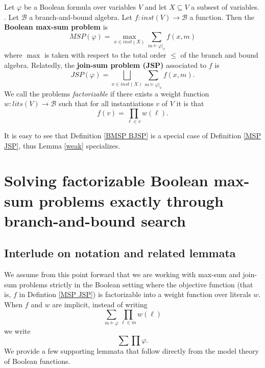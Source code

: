 \documentclass[acmsmall,review]{acmart}\settopmatter{printfolios=true,printccs=false,printacmref=false}
\begin{document}
\begin{definition}\label{BMSP BJSP}
  Let $\varphi$ be a Boolean formula over variables $V$ and let $X \subseteq V$ a subsest of variables. . Let $\mathcal B$ a branch-and-bound algebra. Let $f: inst(V) \to \mathcal B$ a function. Then the \textbf{Boolean max-sum problem} is
  \begin{equation}\label{BMSP}
    MSP(\varphi) = \max_{x \in inst(X)} \sum_{m \models \varphi|_x} f(x,m)
  \end{equation}
  where $\max$ is taken with respect to the total order $\leq$ of the branch and bound algebra. Relatedly, the \textbf{join-sum problem (JSP)} associated to $f$ is 
  \begin{equation}\label{BJSP}
    JSP(\varphi) = \bigsqcup_{x \in inst(X)} \sum_{m \models \varphi|_x} f(x,m).
  \end{equation}
  We call the problems \emph{factorizable} if there exists a weight function $w : lits(V) \to \mathcal B$ such that for all instantiations $v$ of $V$ it is that
  \begin{equation}\label{factor}
    f(v) = \prod_{\ell \in v} w(\ell).
  \end{equation}
\end{definition}

It is easy to see that Definition \ref{BMSP BJSP} is a special case of Definition \ref{MSP JSP}, thus Lemma \ref{weak} specializes.


\section{Solving factorizable Boolean max-sum problems exactly through branch-and-bound search}

\subsection{Interlude on notation and related lemmata}

We assume from this point forward that we are working with max-sum and join-sum problems strictly in the Boolean setting where the objective function (that is, $f$ in Defintion \ref{MSP JSP}) is factorizable into a weight function over literals $w$. When $f$ and $w$ are implicit, instead of writing
\begin{equation}
  \sum_{m \models \varphi} \prod_{\ell \in m} w(\ell)
\end{equation}
we write
\begin{equation}
  \sum\prod \varphi.
\end{equation}
We provide a few supporting lemmata that follow directly from the model theory of Boolean functions.
\end{document}
